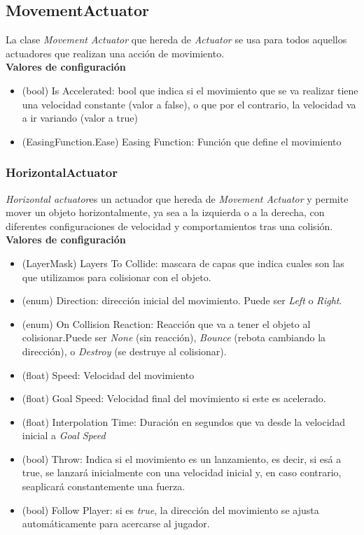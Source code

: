 \subsection{MovementActuator}
La clase \textit{Movement Actuator} que hereda de \textit{Actuator} se usa para todos aquellos actuadores que realizan una acción de movimiento.\\
\textbf{Valores de configuración}
\begin{itemize}
	\item (bool) Is Accelerated: bool que indica si el movimiento que se va realizar tiene una velocidad constante (valor a false), o que por el contrario, la velocidad va a ir variando (valor a true)
	\item (EasingFunction.Ease) Easing Function: Función que define el movimiento 
\end{itemize}

\subsubsection{HorizontalActuator}
\textit{Horizontal actuator}es un actuador que hereda de \textit{Movement Actuator} y permite mover un objeto horizontalmente, ya sea a la izquierda o a la derecha, con diferentes configuraciones de velocidad y comportamientos tras una colisión.\\
\textbf{Valores de configuración}
\begin{itemize}
	\item (LayerMask) Layers To Collide: mascara de capas que indica cuales son las que utilizamos para colisionar con el objeto.
	\item (enum) Direction: dirección inicial del movimiento. Puede ser \textit{Left} o \textit{Right}.
	\item (enum) On Collision Reaction: Reacción que va a tener el objeto al colisionar.Puede ser \textit{None} (sin reacción), \textit{Bounce} (rebota cambiando la dirección), o \textit{Destroy} (se destruye al colisionar).
	\item (float) Speed: Velocidad del movimiento
	\item (float) Goal Speed: Velocidad final del movimiento si este es acelerado.
	\item (float) Interpolation Time: Duración en segundos que va desde la velocidad inicial a \textit{ Goal Speed}
	\item (bool) Throw: Indica si el movimiento es un lanzamiento, es decir, si esá a true, se lanzará inicialmente con una velocidad inicial y, en caso contrario, seaplicará constantemente una fuerza.
	\item (bool) Follow Player: si es \textit{true}, la dirección del movimiento se ajusta automáticamente para acercarse al jugador.
\end{itemize}

